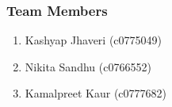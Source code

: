 \subsubsection{Team Members}
\begin{enumerate}
    \item Kashyap Jhaveri (c0775049)
    \item Nikita Sandhu (c0766552)
    \item Kamalpreet  Kaur (c0777682) 
\end{enumerate}